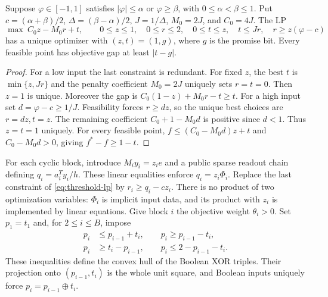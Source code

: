 \begin{lemma}\label{lem:threshold-lp}
Suppose $\varphi\in[-1,1]$ satisfies $|\varphi|\leq\alpha$ or
$\varphi\geq\beta$, with $0\leq\alpha<\beta\leq1$.
Put $c=(\alpha+\beta)/2$, $\Delta=(\beta-\alpha)/2$,
$J=1/\Delta$, $M_0=2J$, and $C_0=4J$.
The LP
\begin{equation}\label{eq:threshold-lp}
 \max\ C_0z-M_0r+t,\qquad
 0\leq z\leq1,\quad0\leq r\leq2,\quad
 0\leq t\leq z,\quad t\leq Jr,\quad r\geq z(\varphi-c)
\end{equation}
has a unique optimizer with $(z,t)=(1,g)$, where $g$ is the promise bit.
Every feasible point has objective gap at least $|t-g|$.
\end{lemma}
\begin{proof}
For a low input the last constraint is redundant.  For fixed $z$, the
best $t$ is $\min\{z,Jr\}$ and the penalty coefficient $M_0=2J$
uniquely sets $r=t=0$.  Then $z=1$ is unique.  Moreover the gap is
$C_0(1-z)+M_0r-t\geq t$.
For a high input set $d=\varphi-c\geq1/J$.  Feasibility forces
$r\geq dz$, so the unique best choices are $r=dz,t=z$.
The remaining coefficient $C_0+1-M_0d$ is positive since $d<1$.
Thus $z=t=1$ uniquely.  For every feasible point,
$f\leq(C_0-M_0d)z+t$ and $C_0-M_0d>0$, giving
$f^*-f\geq1-t$.
\end{proof}

For each cyclic block, introduce $M_iy_i=z_ie$ and a public sparse
readout chain defining $q_i=a_i^Ty_i/h$.  These linear equalities enforce
$q_i=z_i\Phi_i$.  Replace the last constraint of
\eqref{eq:threshold-lp} by $r_i\geq q_i-cz_i$.
There is no product of two optimization variables: $\Phi_i$ is implicit
input data, and its product with $z_i$ is implemented by linear equations.
Give block $i$ the objective weight $\theta_i>0$.
Set $p_1=t_1$ and, for $2\leq i\leq B$, impose
\begin{equation}\label{eq:xor-facets}
 \begin{split}
 p_i&\leq p_{i-1}+t_i,\qquad p_i\geq p_{i-1}-t_i,\\
 p_i&\geq t_i-p_{i-1},\qquad p_i\leq2-p_{i-1}-t_i.
 \end{split}
\end{equation}
These inequalities define the convex hull of the Boolean XOR triples.  Their projection onto
$(p_{i-1},t_i)$ is the whole unit square, and Boolean inputs uniquely
force $p_i=p_{i-1}\mathbin\oplus t_i$.

